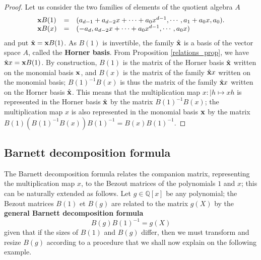 \documentclass{standalone}
\begin{document}
\begin{proof}
Let us consider the two families of elements of the quotient algebra $A$
\begin{equation}
	\begin{array}{lll}
		\bold{x}B(1) & = & (a_{d-1} + a_{d-2}x + \cdots + a_0x^{d-1}, \cdots, a_1 + a_0x,  a_0).\\
		\bold{x}B(x) & = & (-a_d, a_{d-2}x + \cdots + a_0x^{d-1}, \cdots, a_0x)
	\end{array}
\end{equation}
and put $\hat{\bold{x}} = \bold{x}B(1)$.
As $B(1)$ is invertible, the family $\hat{\bold{x}}$ is a basis of the vector space $A$, called the {\bf Horner basis}.
From Proposition \ref{relations_prop}, we have $\hat{\bold{x}}x = \bold{x}B(1)$. 
By construction, $B(1)$ is the matrix of the Horner basis $\hat{\bold{x}}$ written on the monomial basis $\bold{x}$, and $B(x)$ is the matrix of the family $\hat{\bold{x}}x$ written on the monomial basis;
$B(1)^{-1}B(x)$ is thus the matrix of the family $\hat{\bold{x}}x$ written on the Horner basis $\hat{\bold{x}}$. 
This means that the multiplication map $x : \left\vert h \mapsto xh\right.$ is represented in the Horner basis $\hat{\bold{x}}$ by the matrix $B(1)^{-1}B(x)$;
the multiplication map $x$ is also represented in the monomial basis $\bold{x}$ by the matrix $B(1)(B(1)^{-1}B(x))B(1)^{-1} = B(x)B(1)^{-1}$.
\end{proof}

\subsection{Barnett decomposition formula}
\label{Bar_gen}
The Barnett decomposition formula relates the companion matrix, representing the multiplication map $x$, to the Bezout matrices of the polynomials $1$ and $x$;
this can be naturally extended as follows.
Let $g \in \mathbb{Q}[x]$ be any polynomial;
the Bezout matrices $B(1)$ et $B(g)$ are related to the matrix $g(X)$ by the {\bf general Barnett decomposition formula}
\begin{equation}
	\label{GBG}
	B(g)B(1)^{-1} = g(X)
\end{equation}
given that if the sizes of $B(1)$ and $B(g)$ differ, then we must transform and resize $B(g)$ according to a procedure that we shall now explain on the following example.
\end{document}
